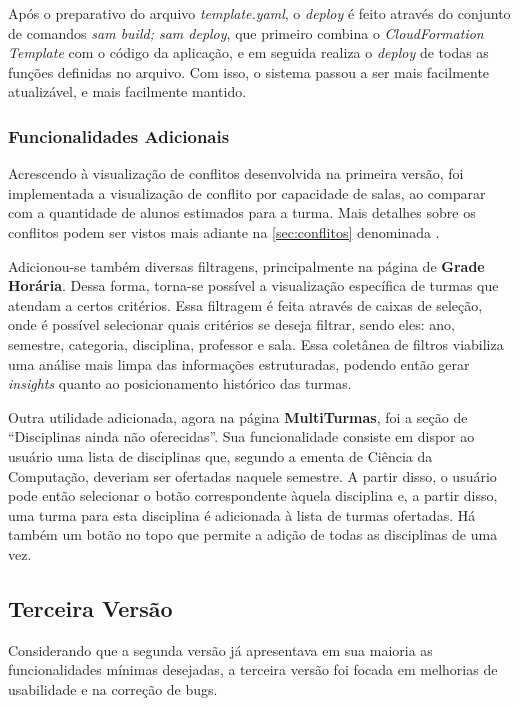Após o preparativo do arquivo \textit{template.yaml}, o \textit{deploy} é feito através do conjunto de comandos \textit{sam build; sam deploy}, que primeiro combina o \textit{CloudFormation Template} com o código da aplicação, e em seguida realiza o \textit{deploy} de todas as funções definidas no arquivo. Com isso, o sistema passou a ser mais facilmente atualizável, e mais facilmente mantido.

\subsubsection{Funcionalidades Adicionais}

Acrescendo à visualização de conflitos desenvolvida na primeira versão, foi implementada a visualização de conflito por capacidade de salas, ao comparar com a quantidade de alunos estimados para a turma. Mais detalhes sobre os conflitos podem ser vistos mais adiante na \autoref{sec:conflitos} denominada .

Adicionou-se também diversas filtragens, principalmente na página de \textbf{Grade Horária}. Dessa forma, torna-se possível a visualização específica de turmas que atendam a certos critérios. Essa filtragem é feita através de caixas de seleção, onde é possível selecionar quais critérios se deseja filtrar, sendo eles: ano, semestre, categoria, disciplina, professor e sala. Essa coletânea de filtros viabiliza uma análise mais limpa das informações estruturadas, podendo então gerar \textit{insights} quanto ao posicionamento histórico das turmas.

Outra utilidade adicionada, agora na página \textbf{MultiTurmas}, foi a seção de ``Disciplinas ainda não oferecidas''. Sua funcionalidade consiste em dispor ao usuário uma lista de disciplinas que, segundo a ementa de Ciência da Computação, deveriam ser ofertadas naquele semestre. A partir disso, o usuário pode então selecionar o botão correspondente àquela disciplina e, a partir disso, uma turma para esta disciplina é adicionada à lista de turmas ofertadas. Há também um botão no topo que permite a adição de todas as disciplinas de uma vez.

\subsection{Terceira Versão} %

Considerando que a segunda versão já apresentava em sua maioria as funcionalidades mínimas desejadas, a terceira versão foi focada em melhorias de usabilidade e na correção de bugs.

